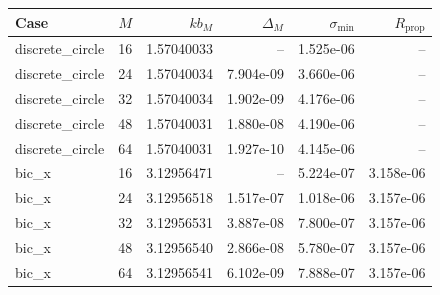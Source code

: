 \begin{tabular}{lrrrrr}
\hline
Case & $M$ & $kb_M$ & $\Delta_M$ & $\sigma_{\min}$ & $R_{\mathrm{prop}}$ \\
\hline
discrete_circle & 16 & 1.57040033 & -- & 1.525e-06 & -- \\
discrete_circle & 24 & 1.57040034 & 7.904e-09 & 3.660e-06 & -- \\
discrete_circle & 32 & 1.57040034 & 1.902e-09 & 4.176e-06 & -- \\
discrete_circle & 48 & 1.57040031 & 1.880e-08 & 4.190e-06 & -- \\
discrete_circle & 64 & 1.57040031 & 1.927e-10 & 4.145e-06 & -- \\
bic_x & 16 & 3.12956471 & -- & 5.224e-07 & 3.158e-06 \\
bic_x & 24 & 3.12956518 & 1.517e-07 & 1.018e-06 & 3.157e-06 \\
bic_x & 32 & 3.12956531 & 3.887e-08 & 7.800e-07 & 3.157e-06 \\
bic_x & 48 & 3.12956540 & 2.866e-08 & 5.780e-07 & 3.157e-06 \\
bic_x & 64 & 3.12956541 & 6.102e-09 & 7.888e-07 & 3.157e-06 \\
\hline
\end{tabular}
